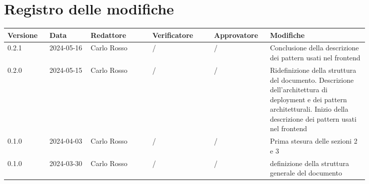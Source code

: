 \section*{Registro delle modifiche}
 {
  \renewcommand{\arraystretch}{1.5}
  \scriptsize
  \begin{longtable}{p{0.10\linewidth}p{0.10\linewidth}p{0.15\linewidth}p{0.15\linewidth}p{0.10\linewidth}p{0.24\linewidth}}
	  \textbf{Versione} & \textbf{Data} & \textbf{Redattore} & \textbf{Verificatore} & \textbf{Approvatore} & \textbf{Modifiche}                                 \\
	  \toprule
	  0.2.1             & 2024-05-16    & Carlo Rosso        & /
	  & /                    & Conclusione della descrizione dei pattern usati
	  nel frontend \\
	  \hline
	  0.2.0             & 2024-05-15    & Carlo Rosso        & /
	  & /                    & Ridefinizione della struttura del documento.
	  Descrizione dell'architettura di deployment e dei pattern architetturali.
	  Inizio della descrizione dei pattern usati nel frontend \\
	  \hline
	  0.1.0             & 2024-04-03    & Carlo Rosso        & /                     & /                    & Prima stesura delle sezioni 2 e 3                  \\
	  \hline
	  0.1.0             & 2024-03-30    & Carlo Rosso        & /                     & /                    & definizione della struttura generale del documento \\
	  \bottomrule
  \end{longtable}
 }
